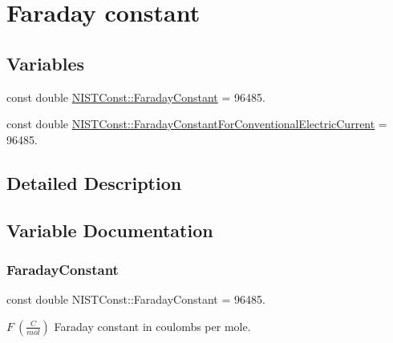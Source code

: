 \hypertarget{group___n_i_s_t_const-_faraday_constant}{}\section{Faraday constant}
\label{group___n_i_s_t_const-_faraday_constant}
\subsection*{Variables}
\begin{DoxyCompactItemize}
\item 
const double \mbox{\hyperlink{group___n_i_s_t_const-_faraday_constant_ga3a2104c5d85a6e687d615ec8004aa4c5}{N\+I\+S\+T\+Const\+::\+Faraday\+Constant}} = 96485.
\item 
const double \mbox{\hyperlink{group___n_i_s_t_const-_faraday_constant_ga06079db2ebfcb103460b80a977171ac0}{N\+I\+S\+T\+Const\+::\+Faraday\+Constant\+For\+Conventional\+Electric\+Current}} = 96485.
\end{DoxyCompactItemize}


\subsection{Detailed Description}


\subsection{Variable Documentation}
\mbox{\label{group___n_i_s_t_const-_faraday_constant_ga3a2104c5d85a6e687d615ec8004aa4c5}} 
\subsubsection{\texorpdfstring{Faraday\+Constant}{FaradayConstant}}
{\footnotesize\ttfamily const double N\+I\+S\+T\+Const\+::\+Faraday\+Constant = 96485.}

$F \ (\frac{C}{mol})$ Faraday constant in coulombs per mole. \mbox{\label{group___n_i_s_t_const-_faraday_constant_ga06079db2ebfcb103460b80a977171ac0}} 
